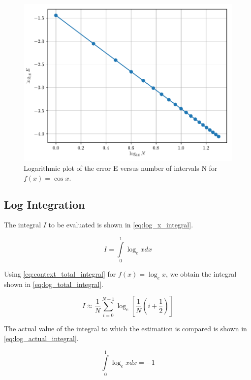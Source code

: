 \documentclass[a4paper,titlepage]{article}
\begin{document}
	\begin{figure}[!htb]
		\centering
		\includegraphics[width=\columnwidth]{plots/q4a.pdf}
		\caption
		{Logarithmic plot of the error E versus number of intervals N for $f(x) = \cos x$.}
		\label{fig:q4a}
	\end{figure}
	
	\subsection{Log Integration}
	
	The integral $I$ to be evaluated is shown in \cref{eq:log_x_integral}.
	
	\begin{equation} \label{eq:log_x_integral}
		I = \int\limits_{0}^{1} \log_e x dx 
	\end{equation}
	
	Using \cref{eq:context_total_integral} for $f(x) = \log_e x$, we obtain the integral shown in \cref{eq:log_total_integral}.
	
	\begin{equation} \label{eq:log_total_integral}
		I \approx \frac{1}{N} \sum_{i=0}^{N-1} \log_e \left[ \frac{1}{N} \left(i + \frac{1}{2} \right) \right]
	\end{equation}
	
	The actual value of the integral to which the estimation is compared is shown in \cref{eq:log_actual_integral}.
	
	\begin{equation} \label{eq:log_actual_integral}
		\int\limits_{0}^{1} \log_e x dx = -1
	\end{equation}
	
\end{document}
